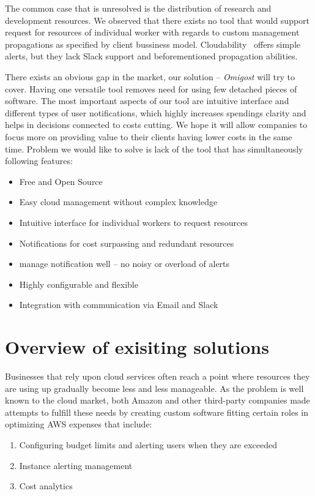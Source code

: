 \documentclass[licencjacka,en]{thesisclass}
\begin{document}
    The common case that is unresolved is the distribution of research and development resources.
    We observed that there exists no tool that would support request for resources of individual worker with regards to custom management propagations as specified by client bussiness model.
    Cloudability~\cite{CloudabilityAlerts} offers simple alerts, but they lack Slack support and beforementioned propagation abilities.

    There exists an obvious gap in the market, our solution -- \textit{Omigost} will try to cover. Having one versatile tool removes need for using few detached pieces of software. The most important aspects of our tool are intuitive interface and different types of user notifications, which highly increases spendings clarity and helps in decisions connected to costs cutting. We hope it will allow companies to focus more on providing value to their clients having lower costs in the same time.
    Problem we would like to solve is lack of the tool that has simultaneously following features:
    \begin{itemize}
        \item Free and Open Source
        \item Easy cloud management without complex knowledge
        \item Intuitive interface for individual workers to request resources
        \item Notifications for cost surpassing and redundant resources
        \item manage notification well -- no noisy or overload of alerts
        \item Highly configurable and flexible
        \item Integration with communication via Email and Slack
    \end{itemize}

    \section{Overview of exisiting solutions}

    Businesses that rely upon cloud services often reach a point where resources
    they are using up gradually become less and less manageable.
    As the problem is well known to the cloud market, both Amazon and other third-party companies made attempts
    to fulfill these needs by creating custom software fitting certain roles in optimizing AWS expenses that include:

    \begin{enumerate}
        \item Configuring budget limits and alerting users when they are exceeded
        \item Instance alerting management
        \item Cost analytics
    \end{enumerate}
\end{document}
